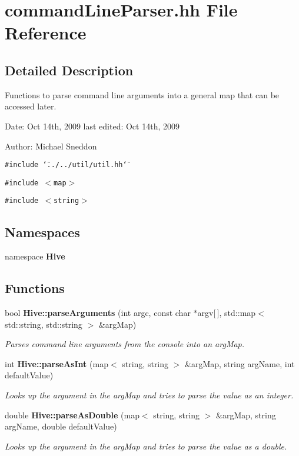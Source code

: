 \section{commandLineParser.hh File Reference}
\label{commandLineParser_8hh}


\subsection{Detailed Description}
Functions to parse command line arguments into a general map that can be accessed later.

\begin{Desc}
\item[Date:]Oct 14th, 2009 last edited: Oct 14th, 2009\end{Desc}
\begin{Desc}
\item[Author:]Michael Sneddon \end{Desc}


{\tt \#include \char`\"{}../../util/util.hh\char`\"{}}\par
{\tt \#include $<$map$>$}\par
{\tt \#include $<$string$>$}\par
\subsection*{Namespaces}
\begin{CompactItemize}
\item 
namespace {\bf Hive}
\end{CompactItemize}
\subsection*{Functions}
\begin{CompactItemize}
\item 
bool {\bf Hive::parseArguments} (int argc, const char $\ast$argv[$\,$], std::map$<$ std::string, std::string $>$ \&argMap)
\begin{CompactList}\small\item\em Parses command line arguments from the console into an argMap. \item\end{CompactList}\item 
int {\bf Hive::parseAsInt} (map$<$ string, string $>$ \&argMap, string argName, int defaultValue)
\begin{CompactList}\small\item\em Looks up the argument in the argMap and tries to parse the value as an integer. \item\end{CompactList}\item 
double {\bf Hive::parseAsDouble} (map$<$ string, string $>$ \&argMap, string argName, double defaultValue)
\begin{CompactList}\small\item\em Looks up the argument in the argMap and tries to parse the value as a double. \item\end{CompactList}\end{CompactItemize}
